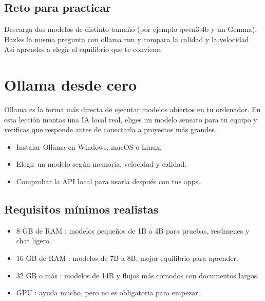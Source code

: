 \documentclass[11pt,a4paper]{book}
\begin{document}
\section{Reto para practicar}
Descarga dos modelos de distinto tamaño (por ejemplo qwen3:4b y un Gemma). Hazles la misma pregunta con ollama run y compara la calidad y la velocidad. Así aprendes a elegir el equilibrio que te conviene.

\chapter{Ollama desde cero}
Ollama es la forma más directa de ejecutar modelos abiertos en tu ordenador. En esta lección montas una IA local real, eliges un modelo sensato para tu equipo y verificas que responde antes de conectarla a proyectos más grandes.

\begin{itemize}\item Instalar Ollama en Windows, macOS o Linux.\end{itemize}
\begin{itemize}\item Elegir un modelo según memoria, velocidad y calidad.\end{itemize}
\begin{itemize}\item Comprobar la API local para usarla después con tus apps.\end{itemize}
\section{Requisitos mínimos realistas}
\begin{itemize}\item 8 GB de RAM : modelos pequeños de 1B a 4B para pruebas, resúmenes y chat ligero.\end{itemize}
\begin{itemize}\item 16 GB de RAM : modelos de 7B a 8B, mejor equilibrio para aprender.\end{itemize}
\begin{itemize}\item 32 GB o más : modelos de 14B y flujos más cómodos con documentos largos.\end{itemize}
\begin{itemize}\item GPU : ayuda mucho, pero no es obligatoria para empezar.\end{itemize}
\end{document}
